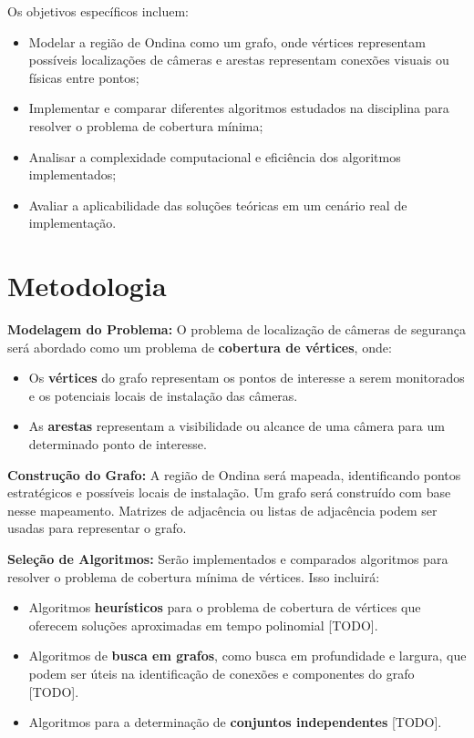 \documentclass[12pt, a4paper]{report}
\begin{document}
Os objetivos específicos incluem:
\begin{itemize}
    \item Modelar a região de Ondina como um grafo, onde vértices representam possíveis localizações de câmeras e arestas representam conexões visuais ou físicas entre pontos;
    \item Implementar e comparar diferentes algoritmos estudados na disciplina para resolver o problema de cobertura mínima;
    \item Analisar a complexidade computacional e eficiência dos algoritmos implementados;
    \item Avaliar a aplicabilidade das soluções teóricas em um cenário real de implementação.
\end{itemize}

\section{Metodologia}
\textbf{Modelagem do Problema:} O problema de localização de câmeras de segurança será abordado como um problema de \textbf{cobertura de vértices}, onde:
\begin{itemize}
    \item Os \textbf{vértices} do grafo representam os pontos de interesse a serem monitorados e os potenciais locais de instalação das câmeras.
    \item As \textbf{arestas} representam a visibilidade ou alcance de uma câmera para um determinado ponto de interesse.
\end{itemize}

\textbf{Construção do Grafo:} A região de Ondina será mapeada, identificando pontos estratégicos e possíveis locais de instalação. Um grafo será construído com base nesse mapeamento. Matrizes de adjacência ou listas de adjacência podem ser usadas para representar o grafo.

\textbf{Seleção de Algoritmos:} Serão implementados e comparados algoritmos para resolver o problema de cobertura mínima de vértices. Isso incluirá:
\begin{itemize}
    \item Algoritmos \textbf{heurísticos} para o problema de cobertura de vértices que oferecem soluções aproximadas em tempo polinomial [TODO].
    \item Algoritmos de \textbf{busca em grafos}, como busca em profundidade e largura, que podem ser úteis na identificação de conexões e componentes do grafo [TODO].
    \item  Algoritmos para a determinação de \textbf{conjuntos independentes} [TODO].
\end{itemize}
\end{document}
